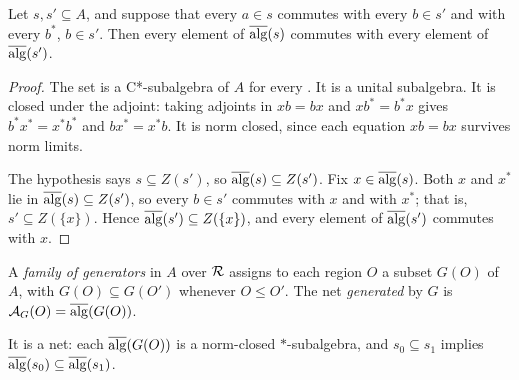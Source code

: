 \begin{lemma}\label{lem:commute}
Let  $s,s'\subseteq A$, and suppose that every $a\in s$ commutes with every $b\in s'$ and with
every $b^*$, $b\in s'$. Then every element of $\overline{\operatorname{alg}}(s)$ commutes with every element of
$\overline{\operatorname{alg}}(s')$.
\end{lemma}
\begin{proof}
The set  is a C*-subalgebra of $A$ for every . It is a unital subalgebra. It is closed
under the adjoint: taking adjoints in $xb=bx$ and $xb^*=b^*x$ gives $b^*x^*=x^*b^*$ and
$bx^*=x^*b$. It is norm closed, since each equation $xb=bx$ survives norm limits.

The hypothesis says $s\subseteq Z(s')$, so $\overline{\operatorname{alg}}(s)\subseteq Z(s')$. Fix $x\in\overline{\operatorname{alg}}(s)$. Both
$x$ and $x^*$ lie in $\overline{\operatorname{alg}}(s)\subseteq Z(s')$, so every $b\in s'$ commutes with $x$ and with
$x^*$; that is, $s'\subseteq Z(\{x\})$. Hence $\overline{\operatorname{alg}}(s')\subseteq Z(\{x\})$, and every element of
$\overline{\operatorname{alg}}(s')$ commutes with $x$.
\end{proof}

\begin{definition}\label{def:generated}
A \emph{family of generators} in $A$ over $\mathcal R$ assigns to each region $O$ a subset $G(O)$ of
$A$, with $G(O)\subseteq G(O')$ whenever $O\leq O'$. The net \emph{generated} by $G$ is
$\mathcal A_G(O)=\overline{\operatorname{alg}}(G(O))$.
\end{definition}
It is a net: each $\overline{\operatorname{alg}}(G(O))$ is a norm-closed $*$-subalgebra, and $s_0\subseteq s_1$ implies
$\overline{\operatorname{alg}}(s_0)\subseteq\overline{\operatorname{alg}}(s_1)$.

